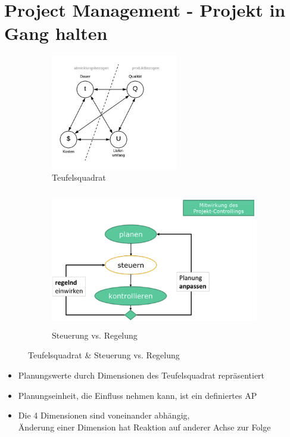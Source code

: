 \documentclass[a4paper]{article}
\begin{document}
\newpage
		
	\section{Project Management - Projekt in Gang halten}
	
	\begin{figure}[!htb]
		\centering
		\begin{subfigure}{.35\textwidth}
			\centering
			\includegraphics[height=5cm]{img/pm/teufelsquadrat.jpeg}
			\caption{Teufelsquadrat}
			\label{fig:pm_teufelsquadrat}
		\end{subfigure}
		\begin{subfigure}{.55\textwidth}
			\centering
			\includegraphics[height=6cm]{img/pm/steuerung.png}
			\caption{Steuerung vs. Regelung}
			\label{fig:pm_steuerung}
		\end{subfigure}
		\caption{Teufelsquadrat \& Steuerung vs. Regelung}
		\label{fig:pm_teufel_steuerung}
	\end{figure}

	\begin{itemize}
		\item Planungswerte durch Dimensionen des Teufelsquadrat repräsentiert
		\item Planungseinheit, die Einfluss nehmen kann, ist ein definiertes AP
		\item Die 4 Dimensionen sind voneinander abhängig,\\ 
		Änderung einer Dimension hat Reaktion auf anderer Achse zur Folge
	\end{itemize}
\end{document}
